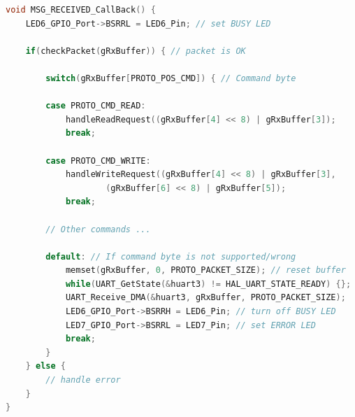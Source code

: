 \begin{lstlisting}[language=C, style=commonstyle, caption={Message handling
routine in the MCU},
    label={lst:mcu-msg-handler}]
void MSG_RECEIVED_CallBack() {
    LED6_GPIO_Port->BSRRL = LED6_Pin; // set BUSY LED

    if(checkPacket(gRxBuffer)) { // packet is OK

        switch(gRxBuffer[PROTO_POS_CMD]) { // Command byte

        case PROTO_CMD_READ:
            handleReadRequest((gRxBuffer[4] << 8) | gRxBuffer[3]);
            break;

        case PROTO_CMD_WRITE:
            handleWriteRequest((gRxBuffer[4] << 8) | gRxBuffer[3],
                    (gRxBuffer[6] << 8) | gRxBuffer[5]);
            break;

        // Other commands ...

        default: // If command byte is not supported/wrong
            memset(gRxBuffer, 0, PROTO_PACKET_SIZE); // reset buffer
            while(UART_GetState(&huart3) != HAL_UART_STATE_READY) {};
            UART_Receive_DMA(&huart3, gRxBuffer, PROTO_PACKET_SIZE);
            LED6_GPIO_Port->BSRRH = LED6_Pin; // turn off BUSY LED
            LED7_GPIO_Port->BSRRL = LED7_Pin; // set ERROR LED
            break;
        }
    } else {
        // handle error
    }
}
\end{lstlisting}